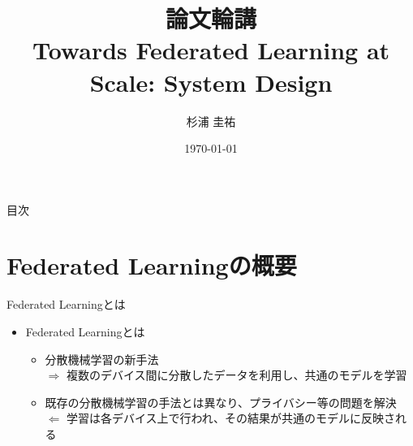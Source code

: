 \documentclass[dvipdfmx,notheorems,t]{beamer}
\title[論文輪講: Federated Learning]{論文輪講 \\ Towards Federated Learning at Scale: System Design}
\author{杉浦 圭祐}
\institute[松谷研究室]{慶應義塾大学理工学部情報工学科 松谷研究室}
\date{\today}
\begin{document}
\frame{\titlepage}

\section{}

\begin{frame}{目次}
\tableofcontents
\end{frame}

\section{Federated Learningの概要}

\begin{frame}{Federated Learningとは}

\begin{itemize}
	\item Federated Learningとは
	\begin{itemize}
		\item \alert{分散機械学習}の新手法 \\
		$\Rightarrow$ 複数のデバイス間に分散したデータを利用し、共通のモデルを学習
		\newline
		\item 既存の分散機械学習の手法とは異なり、プライバシー等の問題を解決 \\
		$\Leftarrow$ 学習は各デバイス上で行われ、その結果が共通のモデルに反映される
	\end{itemize}
\end{itemize}

\end{frame}
\end{document}
